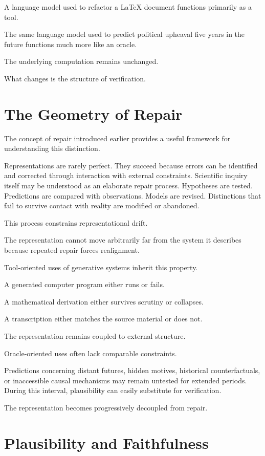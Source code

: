\documentclass[11pt,oneside,openany]{book}
\begin{document}
A language model used to refactor a LaTeX document functions primarily as a tool.

The same language model used to predict political upheaval five years in the future functions much more like an oracle.

The underlying computation remains unchanged.

What changes is the structure of verification.

\section{The Geometry of Repair}

The concept of repair introduced earlier provides a useful framework for understanding this distinction.

Representations are rarely perfect. They succeed because errors can be identified and corrected through interaction with external constraints. Scientific inquiry itself may be understood as an elaborate repair process. Hypotheses are tested. Predictions are compared with observations. Models are revised. Distinctions that fail to survive contact with reality are modified or abandoned.

This process constrains representational drift.

The representation cannot move arbitrarily far from the system it describes because repeated repair forces realignment.

Tool-oriented uses of generative systems inherit this property.

A generated computer program either runs or fails.

A mathematical derivation either survives scrutiny or collapses.

A transcription either matches the source material or does not.

The representation remains coupled to external structure.

Oracle-oriented uses often lack comparable constraints.

Predictions concerning distant futures, hidden motives, historical counterfactuals, or inaccessible causal mechanisms may remain untested for extended periods. During this interval, plausibility can easily substitute for verification.

The representation becomes progressively decoupled from repair.

\section{Plausibility and Faithfulness}
\end{document}
